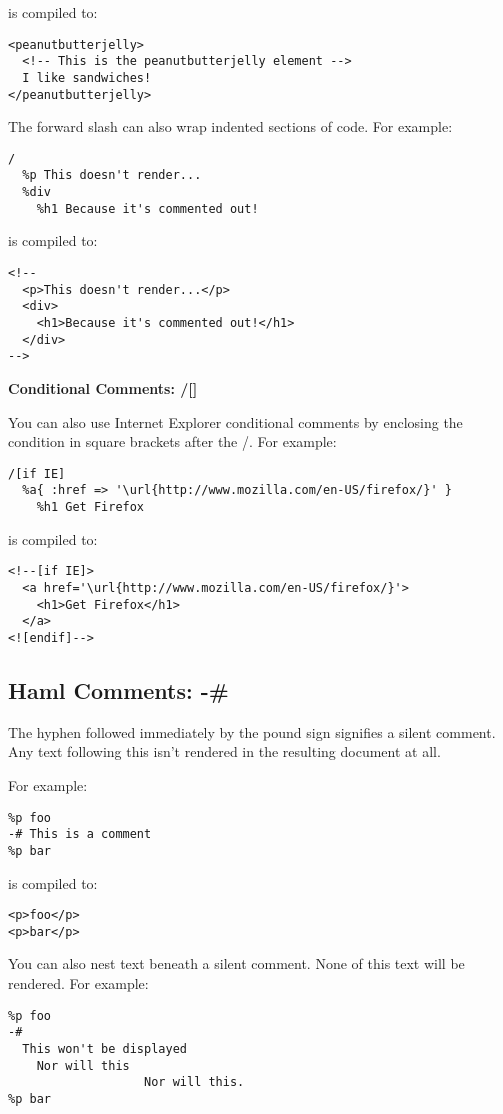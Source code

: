\documentclass[9pt]{article}
\begin{document}
 is compiled to:
\begin{verbatim}
<peanutbutterjelly>
  <!-- This is the peanutbutterjelly element -->
  I like sandwiches!
</peanutbutterjelly>
\end{verbatim}


 The forward slash can also wrap indented sections of code. For example:
\begin{verbatim}
/
  %p This doesn't render...
  %div
    %h1 Because it's commented out!
\end{verbatim}


 is compiled to:
\begin{verbatim}
<!--
  <p>This doesn't render...</p>
  <div>
    <h1>Because it's commented out!</h1>
  </div>
-->
\end{verbatim}
\textbf{Conditional Comments: /[]}


 You can also use Internet Explorer conditional comments by enclosing the condition in square brackets after the /. For example:
\begin{verbatim}
/[if IE]
  %a{ :href => '\url{http://www.mozilla.com/en-US/firefox/}' }
    %h1 Get Firefox
\end{verbatim}


 is compiled to:
\begin{verbatim}
<!--[if IE]>
  <a href='\url{http://www.mozilla.com/en-US/firefox/}'>
    <h1>Get Firefox</h1>
  </a>
<![endif]-->
\end{verbatim}
\subsection{Haml Comments: -\#}


 The hyphen followed immediately by the pound sign signifies a silent comment. Any text following this isn’t rendered in the resulting document at all.


 For example:
\begin{verbatim}
%p foo
-# This is a comment
%p bar
\end{verbatim}


 is compiled to:
\begin{verbatim}
<p>foo</p>
<p>bar</p>
\end{verbatim}


 You can also nest text beneath a silent comment. None of this text will be rendered. For example:
\begin{verbatim}
%p foo
-#
  This won't be displayed
    Nor will this
                   Nor will this.
%p bar
\end{verbatim}
\end{document}
